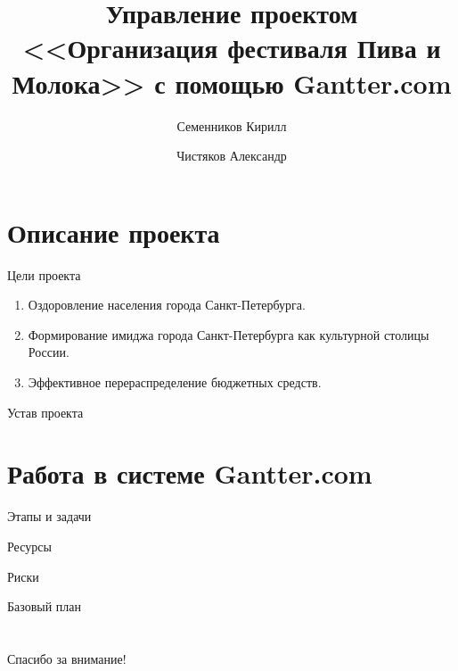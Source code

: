 \documentclass[10pt,pdf,hyperref=unicode,hyperref={bookmarks=false}]{beamer}
\title[Организация фестиваля Пива и Молока]{Управление проектом <<Организация фестиваля Пива и Молока>> с помощью Gantter.com}
\author{Семенников Кирилл\and Чистяков Александр}
\institute{Санкт-Петербургский национальный исследовательский университет информационных технологий, механики и оптики}
\begin{document}
  \begin{frame}
    \maketitle
  \end{frame}
  \section{Описание проекта}
    \begin{frame}{Цели проекта}
      \begin{enumerate}
        \item{Оздоровление населения города Санкт-Петербурга.}
        \item{Формирование имиджа города Санкт-Петербурга как культурной столицы России.}
        \item{Эффективное перераспределение бюджетных средств.}
      \end{enumerate}
    \end{frame} 
    \begin{frame}{Устав проекта}
    \end{frame}
  \section{Работа в системе Gantter.com}
    \begin{frame}{Этапы и задачи}
    \end{frame}
    \begin{frame}{Ресурсы}
    \end{frame}
    \begin{frame}{Риски}
    \end{frame}
    \begin{frame}{Базовый план}
    \end{frame}
  \section*{}
  \begin{frame}{Спасибо за внимание!}
  \end{frame}
\end{document}
